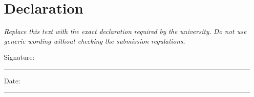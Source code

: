 \chapter*{Declaration}
{}

\emph{Replace this text with the exact declaration required by the university. Do not use generic wording without checking the submission regulations.} %

\vspace{3em}
\noindent Signature: \rule{70mm}{0.4pt}\hfill Date: \rule{35mm}{0.4pt}
